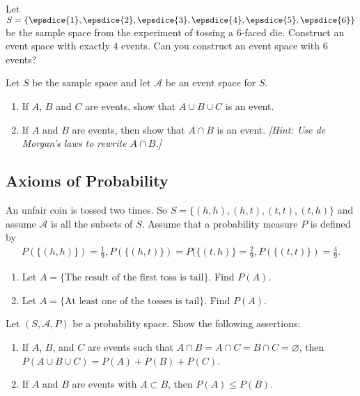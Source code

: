 	\begin{problem}
	Let $S = \{ \epsdice{1} , \epsdice{2} , \epsdice{3} , \epsdice{4} , \epsdice{5} , \epsdice{6} \}$ be the sample space from the experiment of tossing a $6$-faced die. Construct an event space with exactly $4$ events. Can you construct an event space with $6$ events?
	\end{problem}
	
	\begin{problem} %
	Let $S$ be the sample space and let $\mathcal{A}$ be an event space for $S$.
		\begin{enumerate}[label=\alph*)]
		\item If $A$, $B$ and $C$ are events, show that $A \cup B \cup C$ is an event.
		\item If $A$ and $B$ are events, then show that $A \cap B$ is an event. \textit{[Hint: Use de Morgan's laws to rewrite $A \cap B$.]}
		\end{enumerate}
	\end{problem}
	
	\subsection{Axioms of Probability}
	\begin{problem}
	 An unfair coin is tossed two times. So $S = \{ (h, h) , (h, t) , (t, t) , (t, h) \}$ and assume $\mathcal{A}$ is all the subsets of $S$. Assume that a probability measure $P$ is defined by
		\begin{align*}
		P ( \{ (h, h) \} ) = \frac{1}{9} , P ( \{ (h, t) \} ) = P ( \{ (t, h) \} = \frac{2}{9} , P ( \{ (t, t) \}) = \frac{4}{9} .
		\end{align*}
		\begin{enumerate}[label=\alph*)]
		\item Let $A = \{ \text{The result of the first toss is tail} \}$. Find $P (A)$.
		\item Let $A = \{ \text{At least one of the tosses is tail} \}$. Find $P (A)$.
		\end{enumerate}
	\end{problem}
	 
	\begin{problem} %
	Let $(S, \mathcal{A} , P )$ be a probability space. Show the following assertions:
		\begin{enumerate}[label=\alph*)]
		\item If $A$, $B$, and $C$ are events such that $A \cap B = A \cap C = B \cap C = \varnothing$, then $P (A \cup B \cup C ) = P (A ) + P (B) + P (C)$.
		\item If $A$ and $B$ are events with $A \subset B$, then $P (A) \leq P (B)$.
		\end{enumerate}
	\end{problem}

